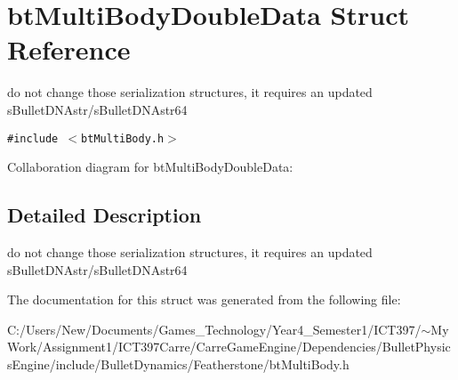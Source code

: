 \hypertarget{structbt_multi_body_double_data}{
\section{btMultiBodyDoubleData Struct Reference}
\label{structbt_multi_body_double_data}
}
do not change those serialization structures, it requires an updated sBulletDNAstr/sBulletDNAstr64  


{\tt \#include $<$btMultiBody.h$>$}

Collaboration diagram for btMultiBodyDoubleData:

\subsection{Detailed Description}
do not change those serialization structures, it requires an updated sBulletDNAstr/sBulletDNAstr64 

The documentation for this struct was generated from the following file:\begin{CompactItemize}
\item 
C:/Users/New/Documents/Games\_\-Technology/Year4\_\-Semester1/ICT397/$\sim$My Work/Assignment1/ICT397Carre/CarreGameEngine/Dependencies/BulletPhysicsEngine/include/BulletDynamics/Featherstone/btMultiBody.h\end{CompactItemize}
